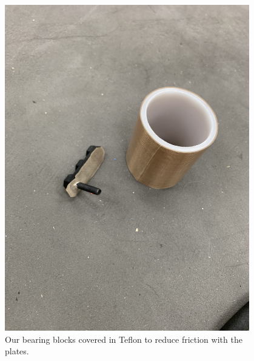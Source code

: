\begin{figure}[ht]
\centering
\begin{minipage}[b]{.48\textwidth}
  \centering
  \includegraphics[width=0.95\textwidth]{Meetings/August/08-26-21/8-26-21_Hardware_Image1 - Nathan Forrer.JPG}
  \caption{Our bearing blocks covered in Teflon to reduce friction with the plates.}
  \label{fig:pic1}
\end{minipage}%
\hfill%
\begin{minipage}[b]{.48\textwidth}
  \centering

\end{minipage}
\end{figure}
